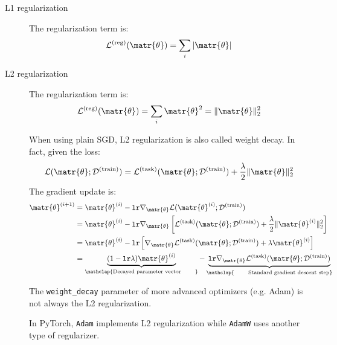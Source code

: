 \begin{description}
    \item[L1 regularization] 
        The regularization term is:
        \[ \mathcal{L}^\text{(reg)}(\matr{\theta}) = \sum_{i} \vert \matr{\theta} \vert \]

    \item[L2 regularization] 
        The regularization term is:
        \[ \mathcal{L}^\text{(reg)}(\matr{\theta}) = \sum_{i} \matr{\theta}^2 = \Vert \matr{\theta} \Vert_2^2 \]

        \begin{remark}
            When using plain SGD, L2 regularization is also called weight decay.
            In fact, given the loss:
            \[ 
                \mathcal{L}(\matr{\theta}; \mathcal{D}^\text{(train)}) = 
                \mathcal{L}^\text{(task)}(\matr{\theta}; \mathcal{D}^\text{(train)}) + 
                \frac{\lambda}{2} \Vert \matr{\theta} \Vert_2^2
            \]
            The gradient update is:
            \[
                \begin{split}
                    \matr{\theta}^{(i+1)} &= \matr{\theta}^{(i)} - \texttt{lr} \nabla_\matr{\theta} \mathcal{L}(\matr{\theta}^{(i)}; \mathcal{D}^\text{(train)}) \\
                        &= \matr{\theta}^{(i)} - \texttt{lr} \nabla_\matr{\theta}\left[ 
                                \mathcal{L}^\text{(task)}(\matr{\theta}; \mathcal{D}^\text{(train)}) + 
                                \frac{\lambda}{2} \Vert \matr{\theta}^{(i)} \Vert_2^2
                            \right] \\
                        &= \matr{\theta}^{(i)} - \texttt{lr} \left[ 
                                \nabla_\matr{\theta} \mathcal{L}^\text{(task)}(\matr{\theta}; \mathcal{D}^\text{(train)}) + 
                                \lambda \matr{\theta}^{(i)}
                            \right] \\
                        &= 
                            \underbrace{(1 - \texttt{lr} \lambda) \matr{\theta}^{(i)}}_{\mathclap{\text{Decayed parameter vector \phantom{aaaa}}}} - 
                            \underbrace{\texttt{lr} \nabla_\matr{\theta} \mathcal{L}^\text{(task)}(\matr{\theta}; \mathcal{D}^\text{(train)})}_{\mathclap{\text{\phantom{aaaa} Standard gradient descent step}}}
                \end{split}  
            \]
        \end{remark}

        \begin{remark}
            The \texttt{weight\_decay} parameter of more advanced optimizers (e.g. Adam) is not always the L2 regularization.
            
            In PyTorch, \texttt{Adam} implements L2 regularization while \texttt{AdamW} uses another type of regularizer.
        \end{remark}
\end{description}


